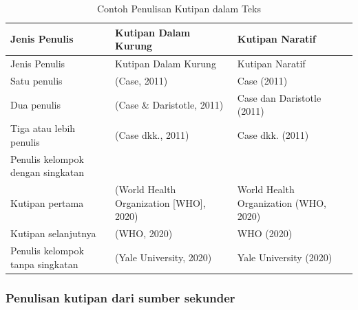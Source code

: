 \documentclass[
  indonesian,
  letterpaper,
]{scrbook}
\begin{document}
\begin{longtable}[]{@{}
  >{\raggedright\arraybackslash}p{}
  >{\raggedright\arraybackslash}p{}
  >{\raggedright\arraybackslash}p{}@{}}
\caption{Contoh Penulisan Kutipan dalam Teks}\tabularnewline
\toprule\noalign{}
\begin{minipage}[b]{\linewidth}\raggedright
Jenis Penulis
\end{minipage} & \begin{minipage}[b]{\linewidth}\raggedright
Kutipan Dalam Kurung
\end{minipage} & \begin{minipage}[b]{\linewidth}\raggedright
Kutipan Naratif
\end{minipage} \\
\midrule\noalign{}
\endfirsthead
\toprule\noalign{}
\begin{minipage}[b]{\linewidth}\raggedright
Jenis Penulis
\end{minipage} & \begin{minipage}[b]{\linewidth}\raggedright
Kutipan Dalam Kurung
\end{minipage} & \begin{minipage}[b]{\linewidth}\raggedright
Kutipan Naratif
\end{minipage} \\
\midrule\noalign{}
\endhead
\bottomrule\noalign{}
\endlastfoot
Satu penulis & (Case, 2011) & Case (2011) \\
Dua penulis & (Case \& Daristotle, 2011) & Case dan Daristotle (2011) \\
Tiga atau lebih penulis & (Case dkk., 2011) & Case dkk. (2011) \\
Penulis kelompok dengan singkatan & & \\
Kutipan pertama & (World Health Organization {[}WHO{]}, 2020) & World
Health Organization (WHO, 2020) \\
Kutipan selanjutnya & (WHO, 2020) & WHO (2020) \\
Penulis kelompok tanpa singkatan & (Yale University, 2020) & Yale
University (2020) \\
\end{longtable}

\subsubsection{Penulisan kutipan dari sumber
sekunder}\label{penulisan-kutipan-dari-sumber-sekunder}
\end{document}
